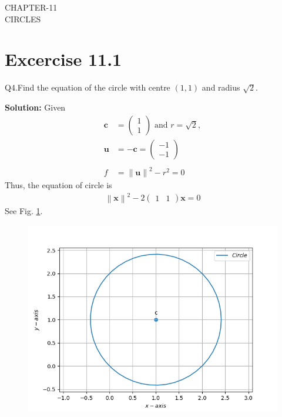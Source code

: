 \documentclass[12pt]{article}
\providecommand{\norm}[1]{\left\lVert#1\right\rVert}
\newcommand{\solution}{\noindent \textbf{Solution: }}
\newcommand{\myvec}[1]{\ensuremath{\begin{pmatrix}#1\end{pmatrix}}}
\let\vec\mathbf
\begin{document}
\begin{center}
\textbf\large{CHAPTER-11 \\ CIRCLES}

\end{center}
\section*{Excercise 11.1}

Q4.Find the equation of the circle with centre $(1,1)$ and radius $\sqrt{2}$.

\solution
\fi
Given
\begin{align}
	\vec{c} &= \myvec{1\\1} \text{ and } r = \sqrt{2},
	\\
	\vec{u}&=\vec{-c}
	 = \myvec{-1\\-1}\\
	 \\
	f &= \norm{\vec{u}}^2 - r^2
	  =0	
\end{align}
Thus, the equation of circle is 
\begin{align}
	\norm{\vec{x}}^2 -2\myvec{1&1}\vec{x} = 0       		       
\end{align}	
See Fig. 
\ref{fig:chapters/11/11/1/4/Fig1}.
\begin{figure}[!h]
	\begin{center} 
	  \includegraphics[width=\columnwidth]{chapters/11/11/1/4/figs/circ.png}
	\end{center}
\caption{}
\label{fig:chapters/11/11/1/4/Fig1}
\end{figure}
\end{document}
